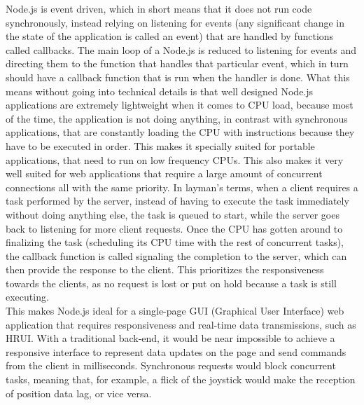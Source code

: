 Node.js is event driven, which in short means that it does not run code synchronously, instead relying on listening for events (any significant change in the state of the application is called an event) that are handled by functions called callbacks. The main loop of a Node.js is reduced to listening for events and directing them to the function that handles that particular event, which in turn should have a callback function that is run when the handler is done. What this means without going into technical details is that well designed Node.js applications are extremely lightweight when it comes to CPU load, because most of the time, the application is not doing anything, in contrast with synchronous applications, that are constantly loading the CPU with instructions because they have to be executed in order. This makes it specially suited for portable applications, that need to run on low frequency CPUs. This also makes it very well suited for web applications that require a large amount of concurrent connections all with the same priority. In layman's terms, when a client requires a task performed by the server, instead of having to execute the task immediately without doing anything else, the task is queued to start, while the server goes back to listening for more client requests. Once the CPU has gotten around to finalizing the task (scheduling its CPU time with the rest of concurrent tasks), the callback function is called signaling the completion to the server, which can then provide the response to the client. This prioritizes the responsiveness towards the clients, as no request is lost or put on hold because a task is still executing.\\

This makes Node.js ideal for a single-page GUI (Graphical User Interface) web application that requires responsiveness and real-time data transmissions, such as HRUI. With a traditional back-end, it would be near impossible to achieve a responsive interface to represent data updates on the page and send commands from the client in milliseconds. Synchronous requests would block concurrent tasks, meaning that, for example, a flick of the joystick would make the reception of position data lag, or vice versa.\\

